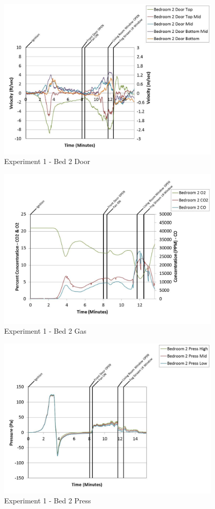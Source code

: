 \documentclass{article}
\begin{document}
\begin{appendices}
	\begin{figure}[h!]
		\centering
		\includegraphics[height=3.05in]{0_Images/Results_Charts/Exp_1_Charts/Bed2Door.pdf}
		\caption{Experiment 1 - Bed 2 Door}
	\end{figure}
 
	\clearpage

	\begin{figure}[h!]
		\centering
		\includegraphics[height=3.05in]{0_Images/Results_Charts/Exp_1_Charts/Bed2Gas.pdf}
		\caption{Experiment 1 - Bed 2 Gas}
	\end{figure}
 

	\begin{figure}[h!]
		\centering
		\includegraphics[height=3.05in]{0_Images/Results_Charts/Exp_1_Charts/Bed2Press.pdf}
		\caption{Experiment 1 - Bed 2 Press}
	\end{figure}
 

\end{appendices}
\end{document}
